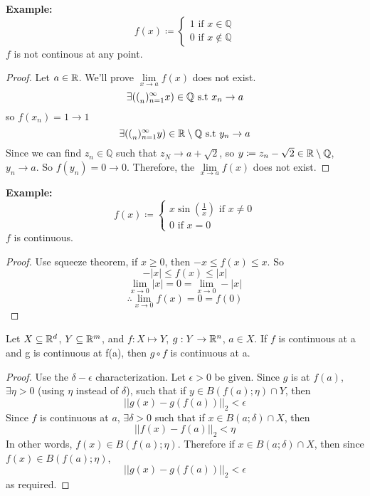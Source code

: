 \documentclass[openany]{report}
\begin{document}
\textbf{Example:} 
\[f(x) \coloneqq \begin{cases}
    1 \text{  if } x \in \mathbb{Q}\\
    0 \text{  if } x \notin \mathbb{Q}
\end{cases}\]
$f$ is not continous at any point.
\begin{proof}
    Let $a \in \mathbb{R}$. We'll prove $\lim\limits_{x \rightarrow a}f(x)$ does not exist.
    \[\exists ({(}_n)_{n=1}^\infty x) \in \mathbb{Q} \text{ s.t } x_n \rightarrow a\]
    so $f(x_n) = 1 \rightarrow 1$
    \[\exists ({(}_n)_{n=1}^\infty y) \in \mathbb{R} \setminus \mathbb{Q} \text{ s.t } y_n \rightarrow a\]
    Since we can find $z_n \in \mathbb{Q}$ such that $z_N \rightarrow a + \sqrt{2}$, so $y \coloneqq z_n - \sqrt{2} \in \mathbb{R} \setminus \mathbb{Q}$, $y_n \rightarrow a$. So $f(y_n) = 0 \rightarrow 0$.  Therefore, the $\lim\limits_{x \rightarrow a}f(x)$ does not exist.
\end{proof}
\textbf{Example:}
\[f(x) \coloneqq \begin{cases}
    x\sin\left(\frac{1}{x}\right) \text{ if } x \neq 0\\
    0 \text{ if } x = 0
\end{cases}\]
$f$ is continuous. 
\begin{proof}
    Use squeeze theorem, if $x \geq 0$, then $-x \leq f(x) \leq x$. So 
    \[-|x| \leq f(x) \leq |x|\]
    \[\lim_{x\rightarrow 0}|x| = 0 = \lim_{x\rightarrow 0}-|x|\]
    \[\therefore \lim_{x\rightarrow 0} f(x) = 0 = f(0)\]
\end{proof}
\begin{prop}
    Let $X \subseteq \mathbb{R}^d$, $Y \subseteq \mathbb{R}^m$, and $f: X \mapsto Y$, $g: Y \rightarrow \mathbb{R}^n$, $a \in X$. If $f$ is continuous at a and g is continuous at f(a), then $g \circ f$ is continuous at a.
\end{prop}
\begin{proof}
    Use the $\delta-\epsilon$ characterization. Let $\epsilon > 0$ be given. Since $g$ is at $f(a)$, $\exists \eta > 0$ (using $\eta$ instead of $\delta$), such that if $y \in B(f(a); \eta) \cap Y$, then 
    \[||g(x) - g(f(a))||_2 < \epsilon\]
    Since $f$ is continuous at $a$, $\exists \delta > 0$ such that if $x \in B(a; \delta) \cap X$, then
    \[||f(x) - f(a)||_2 < \eta\]
    In other words, $f(x) \in B(f(a); \eta)$. Therefore if $x \in B(a; \delta) \cap X$, then since  $f(x) \in B(f(a); \eta)$, 
    \[||g(x) - g(f(a))||_2 < \epsilon\]
    as required.
\end{proof}
\end{document}

